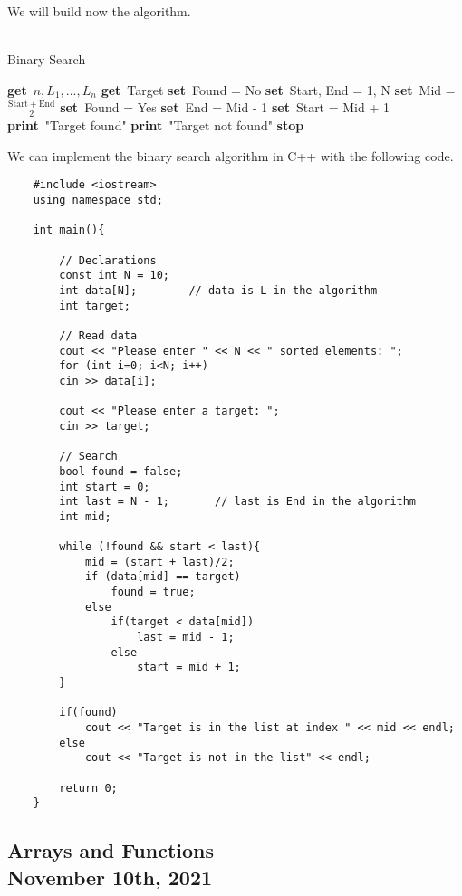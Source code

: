 \documentclass[]{article}
\newcommand{\Get}{\State \textbf{get}~}
\newcommand{\Set}{\State \textbf{set}~}
\newcommand{\Print}{\State \textbf{print}~}
\newcommand{\Stop}{\State \textbf{stop}~}
\begin{document}
We will build now the algorithm.

\begin{algorithm}
	\caption{\\Binary Search}
	\begin{algorithmic}[1]
		\Get $n, L_1, ..., L_n$
		\Get Target
		\Set Found = No
		\Set Start, End = 1, N
		\Set Mid = $\frac{\mathrm{Start + End}}{2}$
		\Set Found = Yes
		\Else
		\Set End = Mid - 1
		\Else
		\Set Start = Mid + 1
		\EndIf
		\EndIf
		\EndWhile
		\Print "Target found"
		\Else
		\Print "Target not found"
		\EndIf
		\Stop
	\end{algorithmic}
\end{algorithm}

We can implement the binary search algorithm in C++ with the following code.

\begin{lstlisting}
	#include <iostream>
	using namespace std;
	
	int main(){
		
		// Declarations
		const int N = 10;
		int data[N];		// data is L in the algorithm
		int target;
		
		// Read data
		cout << "Please enter " << N << " sorted elements: ";
		for (int i=0; i<N; i++)
		cin >> data[i];
		
		cout << "Please enter a target: ";
		cin >> target;
		
		// Search
		bool found = false;
		int start = 0;
		int last = N - 1;       // last is End in the algorithm
		int mid;
		
		while (!found && start < last){
			mid = (start + last)/2;
			if (data[mid] == target)
				found = true;
			else
				if(target < data[mid])
					last = mid - 1;
				else
					start = mid + 1;
		}
		
		if(found)
			cout << "Target is in the list at index " << mid << endl;
		else
			cout << "Target is not in the list" << endl;
		
		return 0;
	}

\end{lstlisting}\bigbreak


\subsection{Arrays and Functions\\ {\normalfont November 10th, 2021}}
\bigbreak
\end{document}
